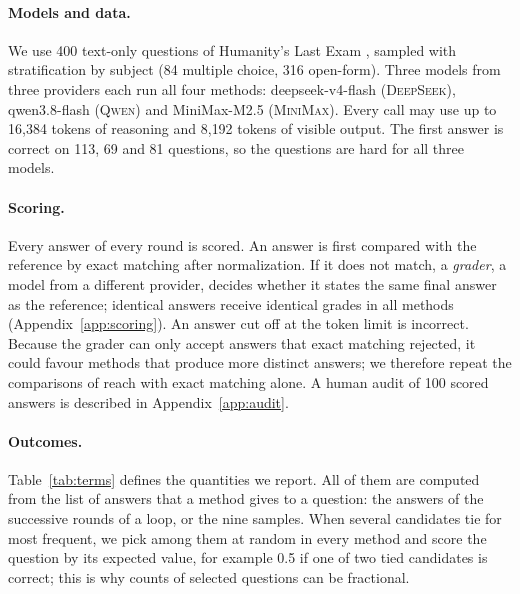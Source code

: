 \documentclass[11pt]{article}
\newcommand{\ds}{\textsc{DeepSeek}}
\newcommand{\qw}{\textsc{Qwen}}
\newcommand{\mm}{\textsc{MiniMax}}
\begin{document}
\paragraph{Models and data.}
We use 400 text-only questions of Humanity's Last Exam \citep{phan2025hle}, sampled with stratification by subject (84 multiple choice, 316 open-form).
Three models from three providers each run all four methods: deepseek-v4-flash (\ds), qwen3.8-flash (\qw) and MiniMax-M2.5 (\mm).
Every call may use up to 16{,}384 tokens of reasoning and 8{,}192 tokens of visible output.
The first answer is correct on 113, 69 and 81 questions, so the questions are hard for all three models.

\paragraph{Scoring.}
Every answer of every round is scored.
An answer is first compared with the reference by exact matching after normalization.
If it does not match, a \emph{grader}, a model from a different provider, decides whether it states the same final answer as the reference; identical answers receive identical grades in all methods (Appendix~\ref{app:scoring}).
An answer cut off at the token limit is incorrect.
Because the grader can only accept answers that exact matching rejected, it could favour methods that produce more distinct answers; we therefore repeat the comparisons of reach with exact matching alone.
A human audit of 100 scored answers is described in Appendix~\ref{app:audit}.

\paragraph{Outcomes.}
Table~\ref{tab:terms} defines the quantities we report.
All of them are computed from the list of answers that a method gives to a question: the answers of the successive rounds of a loop, or the nine samples.
When several candidates tie for most frequent, we pick among them at random in every method and score the question by its expected value, for example 0.5 if one of two tied candidates is correct; this is why counts of selected questions can be fractional.
\end{document}
